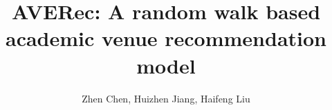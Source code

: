 \documentclass[9pt]{acm_proc_article-sp}
\begin{document}
\title{AVERec: A random walk based academic venue recommendation model}

\author{
\alignauthor
Zhen Chen, Huizhen Jiang, Haifeng Liu\\
       \\
}
\end{document}
